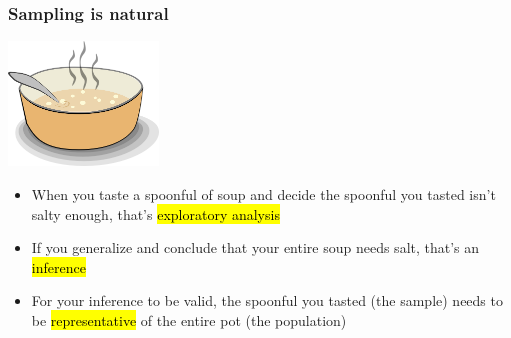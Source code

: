 \documentclass[11pt,containsverbatim,handout,xcolor=xelatex,dvipsnames,table]{beamer}
\begin{document}

\begin{frame}
\frametitle{Sampling is natural}

\begin{center}
\includegraphics[width=0.3\textwidth]{figures/soup}
\end{center}

\begin{itemize}

\item When you taste a spoonful of soup and decide the spoonful you tasted isn't salty 
enough, that's \hl{exploratory analysis}

\item If you generalize and conclude that your entire soup needs salt, that's an \hl{
inference}

\item For your inference to be valid, the spoonful you tasted (the sample) needs to be 
\hl{representative} of the entire pot (the population)

\end{itemize}


\end{frame}
\end{document}
